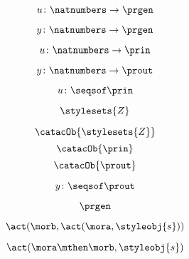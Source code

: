 {\begin{forslides}
  \begin{equation}\label{eq:prgen-u}
    u\colon \natnumbers \to \prgen
  \end{equation}
  
  \begin{equation}\label{eq:prgen-y}
    y\colon \natnumbers \to \prgen
  \end{equation}
  
  
  \begin{equation}\label{eq:prgen-u-1}
    u\colon \natnumbers \to \prin
  \end{equation}
  
  \begin{equation}\label{eq:prgen-y-1}
    y\colon \natnumbers \to \prout
  \end{equation}
  
  \begin{equation}\label{eq:prgen-u-2}
    u\colon \seqsof  \prin
  \end{equation}
  
  
  
  \begin{equation}\label{eq:Z}
    \stylesets{Z}
  \end{equation}
  
  
  \begin{equation}\label{eq:Za}
    \catacOb{\stylesets{Z}}
  \end{equation}
  \begin{equation}\label{eq:Ua}
    \catacOb{\prin}
  \end{equation}
  \begin{equation}\label{eq:Ya}
    \catacOb{\prout}
  \end{equation}
  
  
  
  \begin{equation}\label{eq:prgen-y-2}
    y\colon \seqsof  \prout
  \end{equation}
  
  \begin{equation}\label{eq:prgen}
    \prgen
  \end{equation}

  \begin{equation}\label{eq:now1}
    \act(\morb, \act(\mora, \styleobj{s}))
  \end{equation}
  
  
  \begin{equation}\label{eq:now2}
    \act(\mora\mthen\morb, \styleobj{s})
  \end{equation}
  
\end{forslides}}
